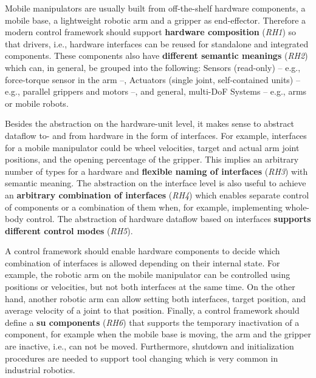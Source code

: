 \documentclass[journal]{IEEEtran}
\begin{document}
Mobile manipulators are usually built from off-the-shelf hardware components, a mobile base, a lightweight robotic arm and a gripper as end-effector. Therefore a modern control framework should support \textbf{hardware composition} (\emph{RH1}) so that drivers, i.e., hardware interfaces can be reused for standalone and integrated components. These components also have \textbf{different semantic meanings} (\emph{RH2}) which can, in general, be grouped into the following: Sensors (read-only) -- e.g., force-torque sensor in the arm --, Actuators (single joint, self-contained units) -- e.g., parallel grippers and motors --, and general, multi-DoF Systems -- e.g., arms or mobile robots.

Besides the abstraction on the hardware-unit level, it makes sense to abstract dataflow to- and from hardware in the form of interfaces.
For example, interfaces for a mobile manipulator could be wheel velocities, target and actual arm joint positions, and the opening percentage of the gripper.
This implies an arbitrary number of types for a hardware and \textbf{flexible naming of interfaces} (\emph{RH3}) with semantic meaning.
The abstraction on the interface level is also useful to achieve an \textbf{arbitrary combination of interfaces} (\emph{RH4}) which enables separate control of components or a combination of them when, for example, implementing whole-body control.
The abstraction of hardware dataflow based on interfaces \textbf{supports different control modes} (\emph{RH5}).

A control framework should enable hardware components to decide which combination of interfaces is allowed depending on their internal state.
For example, the robotic arm on the mobile manipulator can be controlled using positions or velocities, but not both interfaces at the same time.
On the other hand, another robotic arm can allow setting both interfaces, target position, and average velocity of a joint to that position.
Finally, a control framework should define a \textbf{su components} (\emph{RH6}) that supports the temporary inactivation of a component, for example when the mobile base is moving, the arm and the gripper are inactive, i.e., can not be moved.
Furthermore, shutdown and initialization procedures are needed to support tool changing which is very common in industrial robotics.
\end{document}
